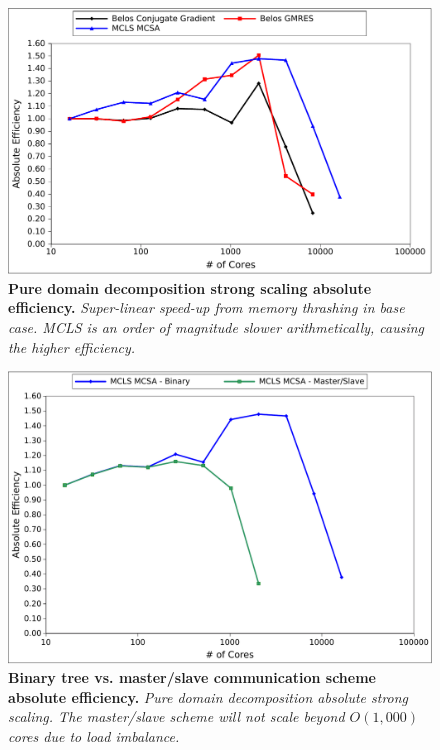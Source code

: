 \begin{figure}[htpb!]
  \begin{center}
    \includegraphics[width=6in]{chapters/parallel_mc/titan_pure_strong.pdf}
  \end{center}
  \caption{\textbf{Pure domain decomposition strong scaling absolute
      efficiency.}  \textit{Super-linear speed-up from memory
      thrashing in base case. MCLS is an order of magnitude slower
      arithmetically, causing the higher efficiency.}}
  \label{fig:titan_pure_strong}
\end{figure}

\begin{figure}[htpb!]
  \begin{center}
    \includegraphics[width=6in]{chapters/parallel_mc/titan_strong_bvsm.pdf}
  \end{center}
  \caption{\textbf{Binary tree vs. master/slave communication scheme
      absolute efficiency.} \textit{Pure domain decomposition absolute
      strong scaling. The master/slave scheme will not scale beyond
      $O(1,000)$ cores due to load imbalance.}}
  \label{fig:titan_strong_bvsm}
\end{figure}

